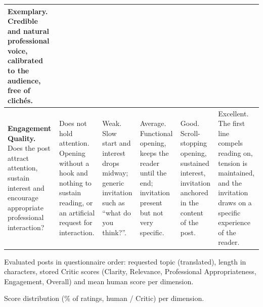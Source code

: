 \documentclass[a4paper,twoside]{article}
\begin{document}
\begin{table}[h]
\begin{tabularx}{\textwidth}{@{}>{\raggedright\arraybackslash}p{2.5cm}*{5}{>{\raggedright\arraybackslash}X}@{}}
Exemplary. Credible and natural professional voice, calibrated to the audience, free of clichés. \\
\midrule
\textbf{Engagement Quality.} Does the post attract attention, sustain interest and encourage appropriate professional interaction? &
Does not hold attention. Opening without a hook and nothing to sustain reading, or an artificial request for interaction. &
Weak. Slow start and interest drops midway; generic invitation such as ``what do you think?''. &
Average. Functional opening, keeps the reader until the end; invitation present but not very specific. &
Good. Scroll-stopping opening, sustained interest, invitation anchored in the content of the post. &
Excellent. The first line compels reading on, tension is maintained, and the invitation draws on a specific experience of the reader. \\
\bottomrule
\end{tabularx}
\end{table}

\begin{table}[h]
\centering
\caption{Evaluated posts in questionnaire order: requested topic (translated), length in characters, stored Critic scores (Clarity, Relevance, Professional Appropriateness, Engagement, Overall) and mean human score per dimension.}
\label{tab:posts}
\footnotesize

\end{table}

\begin{table}[h]
\centering
\caption{Score distribution (\% of ratings, human / Critic) per dimension.}
\label{tab:distribution}
\begin{adjustbox}{max width=\columnwidth}

\end{adjustbox}
\end{table}
\end{document}
